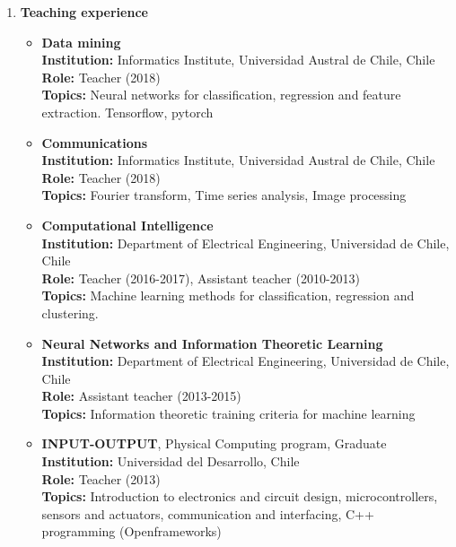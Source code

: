 \documentclass[letterpaper,11pt]{article}
\newcommand{\compactlist}{\setlength{\parskip}{0pt} \setlength{\leftskip}{2em}}
\begin{document}
\begin{enumerate}[I]
	
	    
	\item \textbf{Teaching experience}
	
		\begin{itemize}  \compactlist
		\item \textbf{Data mining}\\
		    \textbf{Institution:} Informatics Institute, Universidad Austral de Chile, Chile \\
            \textbf{Role:} Teacher (2018) \\
            \textbf{Topics:} Neural networks for classification, regression and feature extraction. Tensorflow, pytorch
        \item \textbf{Communications} \\
		    \textbf{Institution:} Informatics Institute, Universidad Austral de Chile, Chile \\
            \textbf{Role:} Teacher (2018) \\
            \textbf{Topics:} Fourier transform, Time series analysis, Image processing
        \item \textbf{Computational Intelligence} \\
            \textbf{Institution:} Department of Electrical Engineering, Universidad de Chile, Chile \\
            \textbf{Role:} Teacher (2016-2017), Assistant teacher (2010-2013)\\
            \textbf{Topics:} Machine learning methods for classification, regression and clustering. %
        \item \textbf{Neural Networks and Information Theoretic Learning} \\
            \textbf{Institution:} Department of Electrical Engineering, Universidad de Chile, Chile \\
            \textbf{Role:} Assistant teacher (2013-2015) \\
            \textbf{Topics:} Information theoretic training criteria for machine learning %
        \item \textbf{INPUT-OUTPUT}, Physical Computing program, Graduate \\
            \textbf{Institution:} Universidad del Desarrollo, Chile \\
            \textbf{Role:} Teacher (2013) \\
            \textbf{Topics:} Introduction to electronics and circuit design, microcontrollers, sensors and actuators, communication and interfacing, C++ programming (Openframeworks)
 

\end{itemize}
\end{enumerate}
\end{document}

